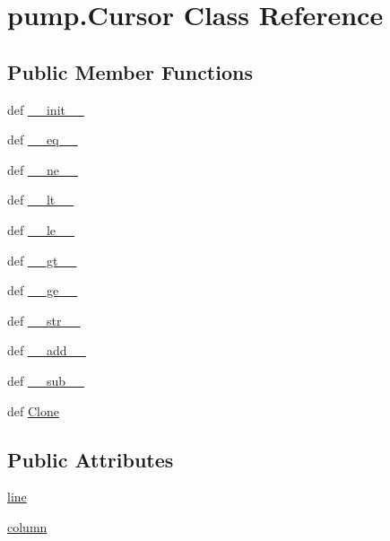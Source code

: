 \hypertarget{classpump_1_1_cursor}{\section{pump.\-Cursor Class Reference}
\label{classpump_1_1_cursor}
}
\subsection*{Public Member Functions}
\begin{DoxyCompactItemize}
\item 
def \hyperlink{classpump_1_1_cursor_a8b444121a5ae7d520551323c61138f0f}{\-\_\-\-\_\-init\-\_\-\-\_\-}
\item 
def \hyperlink{classpump_1_1_cursor_a96da8dd20623722a9889da083cabf7e3}{\-\_\-\-\_\-eq\-\_\-\-\_\-}
\item 
def \hyperlink{classpump_1_1_cursor_a86b89c6ea18d46ec264fd4bb7f2a0a32}{\-\_\-\-\_\-ne\-\_\-\-\_\-}
\item 
def \hyperlink{classpump_1_1_cursor_aa2c63a5d5edaa060df096e3f37da96c5}{\-\_\-\-\_\-lt\-\_\-\-\_\-}
\item 
def \hyperlink{classpump_1_1_cursor_acdc304de7eda4f78161207db38df7826}{\-\_\-\-\_\-le\-\_\-\-\_\-}
\item 
def \hyperlink{classpump_1_1_cursor_a460765fd4e9088d75b9b23c778520110}{\-\_\-\-\_\-gt\-\_\-\-\_\-}
\item 
def \hyperlink{classpump_1_1_cursor_a1bc27327603cb34465f64dee5e143225}{\-\_\-\-\_\-ge\-\_\-\-\_\-}
\item 
def \hyperlink{classpump_1_1_cursor_a090efd1bd0a3abb8fb0e8673b0be2c6a}{\-\_\-\-\_\-str\-\_\-\-\_\-}
\item 
def \hyperlink{classpump_1_1_cursor_a8ea43ccb5076e6483cb5767d429dc6bd}{\-\_\-\-\_\-add\-\_\-\-\_\-}
\item 
def \hyperlink{classpump_1_1_cursor_a27bee26438cc7c63b79de8e3a9d5e094}{\-\_\-\-\_\-sub\-\_\-\-\_\-}
\item 
def \hyperlink{classpump_1_1_cursor_a61c4fbecf05f1fb0eabe12d4680bdccb}{Clone}
\end{DoxyCompactItemize}
\subsection*{Public Attributes}
\begin{DoxyCompactItemize}
\item 
\hyperlink{classpump_1_1_cursor_aee8d8b67360da7fc4e635540cb41d48c}{line}
\item 
\hyperlink{classpump_1_1_cursor_ae73db76c3a845a82afb334633864254e}{column}
\end{DoxyCompactItemize}


